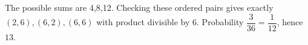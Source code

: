 The possible sums are 4,8,12. Checking these ordered pairs gives exactly $(2,6),(6,2),(6,6)$ with product divisible by 6. Probability $\dfrac{3}{36}=\dfrac{1}{12}$, hence $\boxed{13}$.
